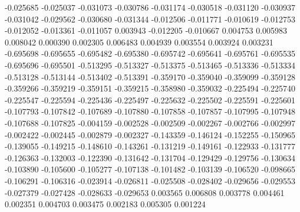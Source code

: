 -0.025685
-0.025037
-0.031073
-0.030786
-0.031174
-0.030518
-0.031120
-0.030937
-0.031042
-0.029562
-0.030680
-0.031344
-0.012506
-0.011771
-0.010619
-0.012753
-0.012052
-0.013361
-0.011057
0.003943
-0.012205
-0.010667
0.004753
0.005983
0.008042
0.000390
0.002305
0.006483
0.004939
0.003554
0.003924
0.003231
-0.695698
-0.695655
-0.695482
-0.695380
-0.695742
-0.695641
-0.695761
-0.695535
-0.695696
-0.695501
-0.513295
-0.513327
-0.513375
-0.513465
-0.513336
-0.513334
-0.513128
-0.513144
-0.513402
-0.513391
-0.359170
-0.359040
-0.359099
-0.359128
-0.359266
-0.359219
-0.359151
-0.359215
-0.358980
-0.359032
-0.225494
-0.225740
-0.225547
-0.225594
-0.225436
-0.225497
-0.225632
-0.225502
-0.225591
-0.225601
-0.107793
-0.107842
-0.107689
-0.107880
-0.107858
-0.107857
-0.107995
-0.107948
-0.107688
-0.107825
-0.004159
-0.002528
-0.002509
-0.002267
-0.002766
-0.002997
-0.002422
-0.002445
-0.002879
-0.002327
-0.143359
-0.146124
-0.152255
-0.150965
-0.139055
-0.149215
-0.148610
-0.143261
-0.131219
-0.149161
-0.122933
-0.131777
-0.126363
-0.132003
-0.122390
-0.131642
-0.131704
-0.129429
-0.129756
-0.130634
-0.103890
-0.105600
-0.105277
-0.107138
-0.101482
-0.103139
-0.106520
-0.098665
-0.106291
-0.106316
-0.023914
-0.026811
-0.025508
-0.028402
-0.029656
-0.029553
-0.027379
-0.027428
-0.028633
-0.029653
0.003565
0.006808
0.003778
0.004461
0.002351
0.004703
0.003475
0.002183
0.005305
0.001224
